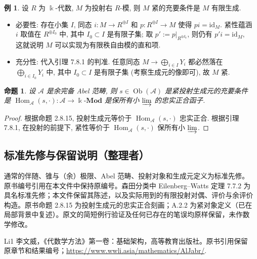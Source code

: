\documentclass[11pt]{article}
\newcommand{\identity}{\mathrm{id}}
\newcommand{\Obj}{\operatorname{Ob}}
\newcommand{\Hom}{\operatorname{Hom}}
\newcommand{\dcate}[1]{\text{-}\mathbf{#1}}
\newcommand{\CorpusNumber}{0}
\newtheorem{proposition}[theorem]{命题}
\theoremstyle{definition}
\newtheorem{example}[theorem]{例}
\begin{document}
\def\CorpusNumber{7.8.2}
\begin{example}
	设 $R$ 为 $\Bbbk$-代数, $M$ 为投射右 $R$-模, 则 $M$ 紧的充要条件是 $M$ 有限生成.
	\begin{itemize}
		\item 必要性: 存在小集 $I$, 同态 $i: M \to R^{\oplus I}$ 和 $p: R^{\oplus I} \to M$ 使得 $pi = \identity_M$. 紧性蕴涵 $i$ 取值在 $R^{\oplus I_0}$ 中, 其中 $I_0 \subset I$ 是有限子集; 取 $p' := p|_{R^{\oplus I_0}}$, 则仍有 $p' i = \identity_M$, 这就说明 $M$ 可以实现为有限秩自由模的直和项.
		\item 充分性: 代入引理 7.8.1 的判准. 任意同态 $M \to \bigoplus_{i \in I} Y_i$ 都必然落在 $\bigoplus_{i \in I_0} Y_i$ 中, 其中 $I_0 \subset I$ 是有限子集 (考察生成元的像即可), 故 $M$ 紧.
	\end{itemize}
\end{example}

\def\CorpusNumber{7.8.3}
\begin{proposition}\label{prop:proj-compact-gen}
	设 $\mathcal{A}$ 是余完备 Abel 范畴, 则 $s \in \Obj(\mathcal{A})$ 是紧投射生成元的充要条件是 $\Hom_{\mathcal{A}}(s, \cdot): \mathcal{A} \to \Bbbk\dcate{Mod}$ 是保所有小 $\varinjlim$ 的忠实正合函子.
\end{proposition}
\begin{proof}
	根据命题 2.8.15, 投射生成元等价于 $\Hom_{\mathcal{A}}(s, \cdot)$ 忠实正合. 根据引理 7.8.1, 在投射的前提下, 紧性等价于 $\Hom_{\mathcal{A}}(s, \cdot)$ 保所有小 $\varinjlim$.
\end{proof}
\subsection*{标准先修与保留说明（整理者）}
通常的伴随、锥与（余）极限、Abel 范畴、投射对象和生成元定义为标准先修。原书编号引用在本文件中保持原编号。森田分类中 Eilenberg--Watts 定理 7.7.2 为具名标准先修；本文件保留其陈述，以及实际用到的有限投射对偶、评价与余评价构造。原书命题 2.8.15 为投射生成元的忠实正合刻画；A.2.2 为紧对象定义（已在局部背景中复述）。原文的简短例行验证及任何已存在的笔误均原样保留，未作数学修改。
\begin{thebibliography}{Li1}
 李文威，《代数学方法》第一卷：基础架构，高等教育出版社。原书引用保留原章节和结果编号；\url{https://www.wwli.asia/mathematics/AlJabr/}.
\end{thebibliography}
\end{document}

